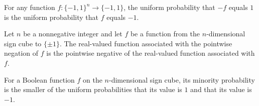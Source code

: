\begin{theorem}
\label{FABL.positiveProbability_neg}
\leanok
{}
For any function $f:\{-1,1\}^n\to\{-1,1\}$, the uniform probability that $-f$ equals $1$
is the uniform probability that $f$ equals $-1$.
\end{theorem}

\begin{theorem}
\label{FABL.BooleanFunction.toReal_neg}
\leanok
{}
Let $n$ be a nonnegative integer and let $f$ be a function from the $n$-dimensional sign
cube to $\{\pm1\}$. The real-valued function associated with the pointwise negation of
$f$ is the pointwise negative of the real-valued function associated with $f$.
\end{theorem}

\begin{definition}
\label{FABL.minorityProbability}
\leanok
{}
For a Boolean function $f$ on the $n$-dimensional sign cube, its minority probability is
the smaller of the uniform probabilities that its value is $1$ and that its value is
$-1$.
\end{definition}

